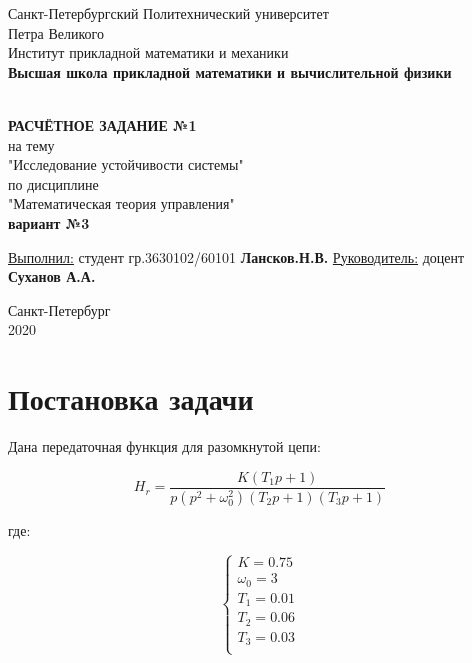 \documentclass[12pt]{article}
\renewcommand{\listoffigures}{\begingroup  %
\tocsection
\tocfile{\listfigurename}{lof}
\endgroup}
\renewcommand{\listoftables}{\begingroup  %
\tocsection
\tocfile{\listtablename}{lot}
\endgroup}
\begin{document}
\begin{titlepage}
	\center
		Санкт-Петербургский Политехнический 
		университет \\ Петра Великого\\
		Институт прикладной математики и механики
		\\ \textbf{Высшая школа прикладной математики и вычислительной физики}

	\vfill ~
	\textbf{
		\\ \large РАСЧЁТНОЕ ЗАДАНИЕ №1
	}
	\\	на тему 
	\\ "Исследование устойчивости системы"
	\\ по дисциплине
	\\ "Математическая теория управления"
    \\ \textbf{вариант №3}
	\vfill ~
    
    
    \begin{flushleft}
    \underline{Выполнил:}  \hspace{\fill} студент гр.3630102/60101 \textbf{Лансков.Н.В.} \linebreak[2]
	\underline{Руководитель:} \hspace{\fill} доцент \textbf{Суханов А.А.} \\ 
    \end{flushleft}
    

\vfill

{\large}	Санкт-Петербург
\\ 2020
\end{titlepage}


\tableofcontents 
\listoffigures
\pagebreak

\section{Постановка задачи}
Дана передаточная функция для разомкнутой цепи:

\begin{equation}
 H_{r} = \dfrac{K(T_1p + 1)}{p(p^2+\omega_0^2)(T_2p + 1)(T_3p + 1)}
\end{equation}

где:

\begin{equation}
\begin{cases}
 K = 0.75 \\
 \omega_0 = 3 \\
 T_1 = 0.01 \\ 
 T_2 = 0.06 \\ 
 T_3 = 0.03 \\ 
\end{cases}
\end{equation}
\end{document}
